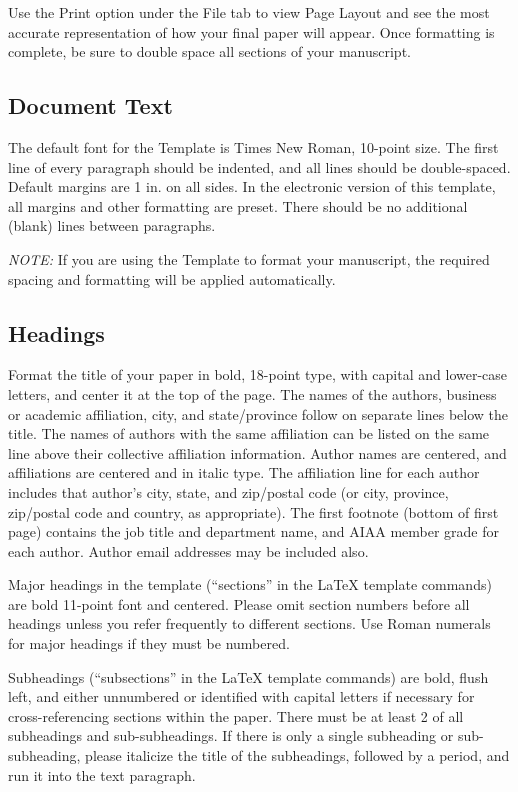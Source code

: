 \documentclass[journal]{new-aiaa}
\begin{document}
Use the Print option under the File tab to view Page Layout and see the most accurate representation of how your final paper will appear. Once formatting is complete, be sure to double space all sections of your manuscript.


\subsection{Document Text}
The default font for the Template is Times New Roman, 10-point size. The first line of every paragraph should be indented, and all lines should be double-spaced. Default margins are 1 in. on all sides. In the electronic version of this template, all margins and other formatting are preset. There should be no additional (blank) lines between paragraphs.

\emph{NOTE:} If you are using the Template to format your manuscript, the required spacing and formatting will be applied automatically.


\subsection{Headings}
Format the title of your paper in bold, 18-point type, with capital and lower-case letters, and center it at the top of the page. The names of the authors, business or academic affiliation, city, and state/province follow on separate lines below the title. The names of authors with the same affiliation can be listed on the same line above their collective affiliation information. Author names are centered, and affiliations are centered and in italic type. The affiliation line for each author includes that author’s city, state, and zip/postal code (or city, province, zip/postal code and country, as appropriate). The first footnote (bottom of first page) contains the job title and department name, and AIAA member grade for each author. Author email addresses may be included also.

Major headings in the template (``sections'' in the \LaTeX{} template commands) are bold 11-point font and centered. Please omit section numbers before all headings unless you refer frequently to different sections. Use Roman numerals for major headings if they must be numbered.

Subheadings (``subsections'' in the \LaTeX{} template commands) are bold, flush left, and either unnumbered or identified with capital letters if necessary for cross-referencing sections within the paper. There must be at least 2 of all subheadings and sub-subheadings. If there is only a single subheading or sub-subheading, please italicize the title of the subheadings, followed by a period, and run it into the text paragraph. 
\end{document}
